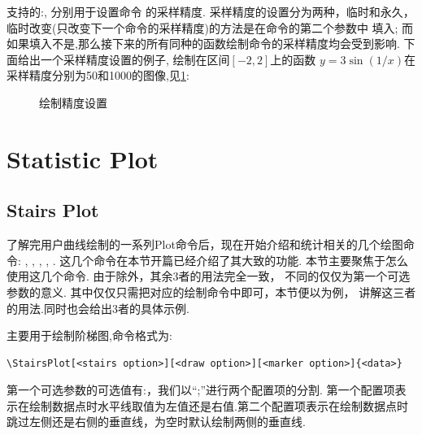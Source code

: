 支持的:, 分别用于设置命令\cmd{\Plot, \ParamPlot, \ContourPlot, \PolarPlot}
的采样精度. 采样精度的设置分为两种，临时和永久，临时改变(只改变下一个命令的采样精度)的方法是在命令的第二个参数中
填入\cmd{[once]}; 而如果填入不是,那么接下来的所有同种的函数绘制命令的采样精度均会受到影响. 
下面给出一个采样精度设置的例子, 绘制在区间$[-2, 2]$上的函数 $y=3\sin(1/x)$在采样精度分别为50和1000的图像,见\cref{fig:plot-precise}:

\begin{figure}[!htb]
    \centering
    \;
    \caption{绘制精度设置}
    \label{fig:plot-precise}
\end{figure}


\section{Statistic Plot}
\subsection{Stairs Plot}
了解完用户曲线绘制的一系列Plot命令后，现在开始介绍和统计相关的几个绘图命令:
\cmd{\ListPlot}\index{\cmd{\ListPlot}}, \cmd{\StairsPlot}\index{\cmd{\StairsPlot}}, 
\cmd{\StemPlot}\index{\cmd{\StemPlot}}, \cmd{\BarPlot}\index{\cmd{\BarPlot}}, \cmd{\ShadePlot}\index{\cmd{\ShadePlot}}.
这几个命令在本节开篇已经介绍了其大致的功能. 本节主要聚焦于怎么使用这几个命令. 由于除\cmd{\ShadePlot,\ListPlot}外，其余3者的用法完全一致，
不同的仅仅为第一个可选参数的意义. 其中\cmd{\ListPlot}仅仅只需把对应的绘制命令中即可，本节便以\cmd{\StairsPlot}为例，
讲解这三者的用法.同时也会给出3者的具体示例.

\cmd{\StairsPlot}主要用于绘制阶梯图,命令格式为:
\begin{verbatim}
\StairsPlot[<stairs option>][<draw option>][<marker option>]{<data>}
\end{verbatim}

第一个可选参数的可选值有:，我们以``;''进行两个配置项的分割.
第一个配置项表示在绘制数据点时水平线取值为左值还是右值.第二个配置项表示在绘制数据点时
跳过左侧还是右侧的垂直线，为空时默认绘制两侧的垂直线. 

